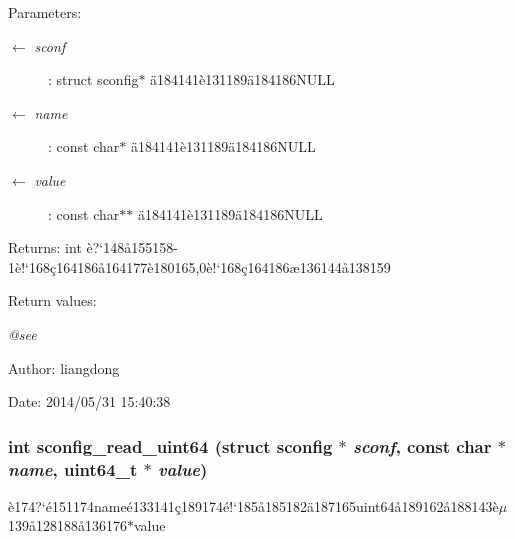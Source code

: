 \begin{Desc}
\item[Parameters:]
\begin{description}
\item[\mbox{$\leftarrow$} {\em sconf}]: struct sconfig$\ast$ \"{a}184141\`{e}131189\"{a}184186NULL \item[\mbox{$\leftarrow$} {\em name}]: const char$\ast$ \"{a}184141\`{e}131189\"{a}184186NULL \item[\mbox{$\leftarrow$} {\em value}]: const char$\ast$$\ast$ \"{a}184141\`{e}131189\"{a}184186NULL \end{description}
\end{Desc}
\begin{Desc}
\item[Returns:]int \`{e}?`148\aa{}155158-1\`{e}!`168\c{c}164186\aa{}164177\`{e}180165,0\`{e}!`168\c{c}164186\ae{}136144\aa{}138159 \end{Desc}
\begin{Desc}
\item[Return values:]
\begin{description}
\item[{\em @see}]\end{description}
\end{Desc}
\begin{Desc}
\item[Author:]liangdong \end{Desc}
\begin{Desc}
\item[Date:]2014/05/31 15:40:38 \end{Desc}
\subsubsection{\setlength{\rightskip}{0pt plus 5cm}int sconfig\_\-read\_\-uint64 (struct sconfig $\ast$ {\em sconf}, const char $\ast$ {\em name}, uint64\_\-t $\ast$ {\em value})}\label{sconfig_8h_a7}


\`{e}174?`\'{e}151174name\'{e}133141\c{c}189174\'{e}!`185\aa{}185182\"{a}187165uint64\aa{}189162\aa{}188143\`{e}$\mu$139\aa{}128188\aa{}136176$\ast$value 


